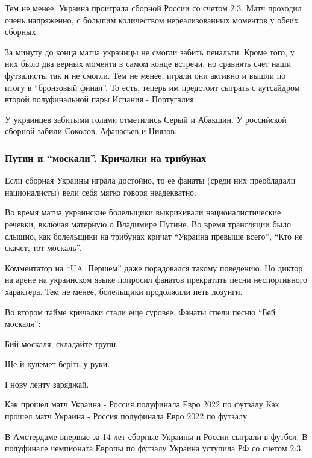 Тем не менее, Украина проиграла сборной России со счетом 2:3. Матч проходил
очень напряженно, с большим количеством нереализованных моментов у обеих
сборных.

За минуту до конца матча украинцы не смогли забить пенальти. Кроме того, у них
было два верных момента в самом конце встречи, но сравнять счет наши футзалисты
так и не смогли. Тем не менее, играли они активно и вышли по итогу в \enquote{бронзовый
финал}. То есть, теперь им предстоит сыграть с аутсайдром второй полуфинальной
пары Испания - Португалия.

У украинцев забитыми голами отметились Серый и Абакшин. У российской сборной
забили Соколов, Афанасьев и Ниязов.

\subsubsection{Путин и \enquote{москали}. Кричалки на трибунах}

Если сборная Украины играла достойно, то ее фанаты (среди них преобладали
националисты) вели себя мягко говоря неадекватно.

Во время матча украинские болельщики выкрикивали националистические речевки,
включая матерную о Владимире Путине. Во время трансляции было слышно, как
болельщики на трибунах кричат \enquote{Украина превыше всего}, \enquote{Кто не скачет, тот
москаль}.


Комментатор на \enquote{UA: Першем} даже порадовался такому поведению. Но
диктор на арене на украинском языке попросил фанатов прекратить песни
неспортивного характера. Тем не менее, болельщики продолжили петь лозунги.

Во втором тайме кричалки стали еще суровее. Фанаты спели песню \enquote{Бей
москаля}:

Бий москаля, складайте трупи.

Ще й кулемет беріть у руки.

І нову ленту заряджай.



Как прошел матч Украина - Россия полуфинала Евро 2022 по футзалу
Как прошел матч Украина - Россия полуфинала Евро 2022 по футзалу

В Амстердаме впервые за 14 лет сборные Украины и России сыграли в футбол. В полуфинале чемпионата Европы по футзалу Украина уступила РФ со счетом 2:3.

